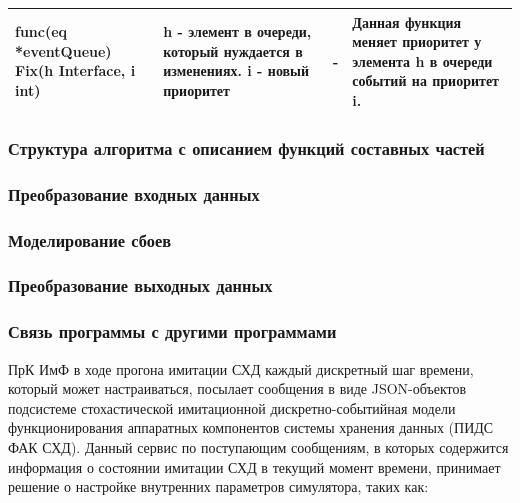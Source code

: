 \begin{table}[]
\begin{tabularx}{\textwidth}{|X|X|X|X|}
		func(eq *eventQueue) Fix(h Interface, i int) & h - элемент в очереди, который нуждается в изменениях. i - новый приоритет & -                                               & Данная функция меняет приоритет у элемента h в очереди событий на приоритет i.                                                                                                                                           \\ \hline
	\end{tabularx}
\end{table}
	



\subsubsection{Структура алгоритма с описанием функций составных частей}

\subsubsection{Преобразование входных данных}


\subsubsection{Моделирование сбоев}

\subsubsection{Преобразование выходных данных}

\subsubsection{Связь программы с другими программами}
ПрК ИмФ в ходе прогона имитации СХД каждый дискретный шаг времени, который может настраиваться, посылает сообщения в виде JSON-объектов подсистеме стохастической имитационной дискретно-событийная модели функционирования аппаратных компонентов системы хранения данных (ПИДС ФАК СХД).  Данный сервис по поступающим сообщениям, в которых содержится информация о состоянии имитации СХД в текущий момент времени, принимает решение о настройке внутренних параметров симулятора, таких как:

